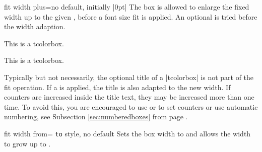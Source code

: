 \begin{docTcbKey}{fit width plus}{=}{no default, initially |0pt|}
  The box is allowed to enlarge the fixed width up to the given ,
  before a font size fit is applied. An optional 
  is tried before the width adaption.
  \enlargethispage*{1cm}
\begin{dispExample}

\begin{tcolorbox}[fit]
This is a tcolorbox.
\end{tcolorbox}
\begin{tcolorbox}[fit,fit width plus=1cm]
This is a tcolorbox.
\end{tcolorbox}
\begin{tcolorbox}[fit]
\lipsum[2]
\end{tcolorbox}
\begin{tcolorbox}[fit,fit width plus=1cm]
\lipsum[2]
\end{tcolorbox}
\end{dispExample}
\end{docTcbKey}


\begin{marker}
Typically but not necessarily, the optional title of a |tcolorbox| is not part of the fit operation.
If a  is applied, the title is also adapted to
the new width. If counters are increased inside the title text, they may be
increased more than one time.
To avoid this, you are encouraged to use  or 
to set counters or use automatic numbering, see Subsection \ref{sec:numberedboxes}
from page \pageref{sec:numberedboxes}.
\end{marker}


\begin{docTcbKey}{fit width from}{= \texttt{to} }{style, no default}
  Sets the box width to  and allows the width to grow up to .
\begin{dispExample}

\begin{tcolorbox}[fit,width=\linewidth/2]
\lipsum[2]
\end{tcolorbox}\par
\begin{tcolorbox}[fit width from=\linewidth/2 to \linewidth]
\lipsum[2]
\end{tcolorbox}\par
\end{dispExample}
\end{docTcbKey}

